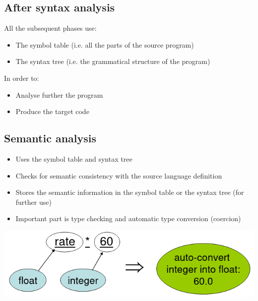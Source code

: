 \documentclass{article}[18pt]
\begin{document}
\subsection{After syntax analysis}
All the subsequent phases use:
\begin{itemize}
	\item The symbol table (i.e. all the parts of the source program)
	\item The syntax tree (i.e. the grammatical structure of the program)
\end{itemize}
In order to:
\begin{itemize}
	\item Analyse further the program
	\item Produce the target code
\end{itemize}
\subsection{Semantic analysis}
\begin{itemize}
	\item Uses the symbol table and syntax tree
	\item Checks for semantic consistency with the source language definition
	\item Stores the semantic information in the symbol table or the syntax tree (for further use)
	\item Important part is type checking and automatic type conversion (coercion)
\end{itemize}
\begin{center}
	\includegraphics[scale=0.7]{Coercion}
\end{center}
\end{document}
